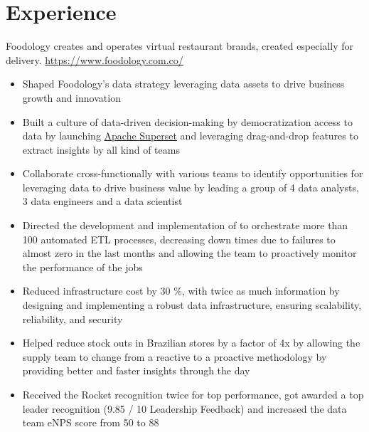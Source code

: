 \documentclass[11pt, letterpaper, sans]{moderncv}
\begin{document}
\section{Experience}
    {
        Foodology creates and operates virtual restaurant brands, created especially for delivery. \url{https://www.foodology.com.co/}
        \vspace{3pt}
        \begin{itemize}
            \item Shaped Foodology's data strategy leveraging data assets to drive business growth and innovation
            \item Built a culture of data-driven decision-making by democratization access to data by launching \href{https://superset.apache.org/}{\color{color3} Apache Superset} and leveraging drag-and-drop features to extract insights by all kind of teams
            \item Collaborate cross-functionally with various teams to identify opportunities for leveraging data to drive business value by leading a group of 4 data analysts, 3 data engineers and a data scientist
            \item Directed the development and implementation of \href{https://airflow.apache.org/}{\color{color3}{Apache Airflow}} to orchestrate more than 100 automated ETL processes, decreasing down times due to failures to almost zero in the last months and allowing the team to proactively monitor the performance of the jobs
            \item Reduced infrastructure cost by 30 \%, with twice as much information by designing and implementing a robust data infrastructure, ensuring scalability, reliability, and security
            \item Helped reduce stock outs in Brazilian stores by a factor of 4x by allowing the supply team to change from a reactive to a proactive methodology by providing better and faster insights through the day
            \item Received the Rocket recognition twice for top performance, got awarded a top leader recognition (9.85 / 10 Leadership Feedback) and increased the data team eNPS score from 50 to 88
        \end{itemize}
    }
\end{document}
